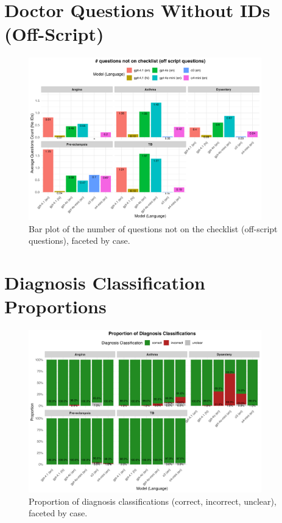 \documentclass{article}
\begin{document}
\section{Doctor Questions Without IDs (Off-Script)}
\begin{figure}[h!]
    \centering
    \includegraphics[width=0.9\textwidth]{figs/doctor_questions_without_ids_plot.png}
    \caption{Bar plot of the number of questions not on the checklist (off-script questions), faceted by case.}
    \label{fig:doc_questions_no_ids}
\end{figure}
\newpage

\section{Diagnosis Classification Proportions}
\begin{figure}[h!]
    \centering
    \includegraphics[width=0.9\textwidth]{figs/diag_classification_proportions_plot.png}
    \caption{Proportion of diagnosis classifications (correct, incorrect, unclear), faceted by case.}
    \label{fig:diag_classification}
\end{figure}
\newpage
\end{document}
